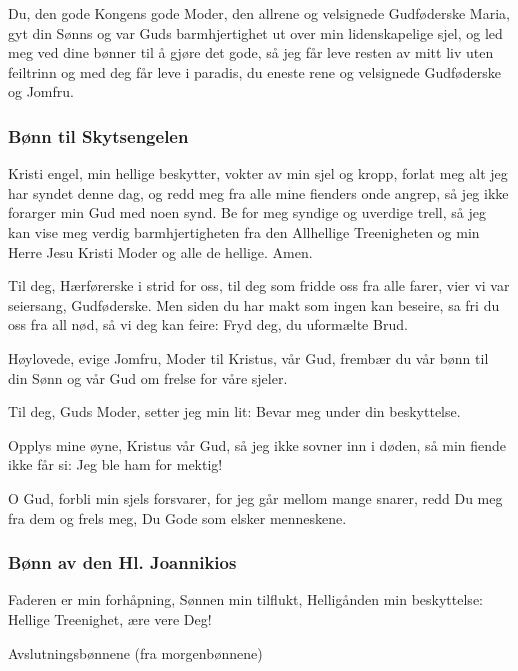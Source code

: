 Du, den gode Kongens gode Moder, den allrene og velsignede Gudføderske Maria, gyt din Sønns og var Guds barmhjertighet ut over min lidenskapelige sjel, og led meg ved dine bønner til å gjøre det gode, så jeg får leve resten av mitt liv uten feiltrinn og med deg får leve i paradis, du eneste rene og velsignede Gudføderske og Jomfru.

\subsubsection{Bønn til Skytsengelen}

Kristi engel, min hellige beskytter, vokter av min sjel og kropp, forlat meg alt jeg har syndet denne dag, og redd meg fra alle mine fienders onde angrep, så jeg ikke forarger min Gud med noen synd. Be for meg syndige og uverdige trell, så jeg kan vise meg verdig barmhjertigheten fra den Allhellige Treenigheten og min Herre Jesu Kristi Moder og alle de hellige. Amen.

Til deg, Hærførerske i strid for oss, til deg som fridde oss fra alle farer, vier vi var seiersang, Gudføderske. Men siden du har makt som ingen kan beseire, sa fri du oss fra all nød, så vi deg kan feire: Fryd deg, du uformælte Brud.

Høylovede, evige Jomfru, Moder til Kristus, vår Gud, frembær du vår bønn til din Sønn og vår Gud om frelse for våre sjeler.

Til deg, Guds Moder, setter jeg min lit: Bevar meg under din beskyttelse.

Opplys mine øyne, Kristus vår Gud, så jeg ikke sovner inn i døden, så min fiende ikke får si: Jeg ble ham for mektig!

O Gud, forbli min sjels forsvarer, for jeg går mellom mange snarer, redd Du meg fra dem og frels meg, Du Gode som elsker menneskene.

\subsubsection{Bønn av den Hl. Joannikios}

Faderen er min forhåpning, Sønnen min tilflukt, Helligånden min beskyttelse: Hellige Treenighet, ære vere Deg!

\begin{forklaring}
Avslutningsbønnene (fra morgenbønnene)
\end{forklaring}